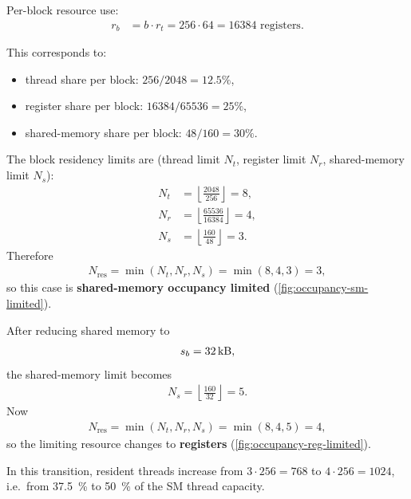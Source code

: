 Per-block resource use:
\begin{align}
  r_b &= b \cdot r_t = 256 \cdot 64 = 16384 \text{ registers}.
\end{align}

This corresponds to:
\begin{itemize}
  \item thread share per block: $256/2048 = 12.5\%$,
  \item register share per block: $16384/65536 = 25\%$,
  \item shared-memory share per block: $48/160 = 30\%$.
\end{itemize}

The block residency limits are (thread limit $N_t$, register limit $N_r$,
shared-memory limit $N_s$):
\begin{align}
  N_t &= \left\lfloor \frac{2048}{256} \right\rfloor = 8, \\
  N_r &= \left\lfloor \frac{65536}{16384} \right\rfloor = 4, \\
  N_s &= \left\lfloor \frac{160}{48} \right\rfloor = 3.
\end{align}
Therefore
\begin{align}
  N_{\text{res}} = \min(N_t,N_r,N_s)=\min(8,4,3)=3,
\end{align}
so this case is \textbf{shared-memory occupancy limited}
(\cref{fig:occupancy-sm-limited}).

After reducing shared memory to
\begin{align}
  s_b = \SI{32}{\kilo\byte},
\end{align}
the shared-memory limit becomes
\begin{align}
  N_s = \left\lfloor \frac{160}{32} \right\rfloor = 5.
\end{align}
Now
\begin{align}
  N_{\text{res}} = \min(N_t,N_r,N_s)=\min(8,4,5)=4,
\end{align}
so the limiting resource changes to \textbf{registers}
(\cref{fig:occupancy-reg-limited}).

In this transition, resident threads increase from
$3\cdot256=768$ to $4\cdot256=1024$, i.e.\ from \SI{37.5}{\percent} to
\SI{50}{\percent} of the SM thread capacity.

